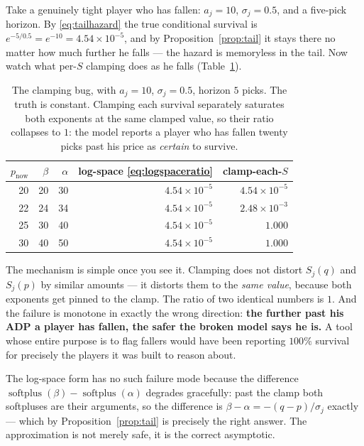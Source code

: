 \documentclass[10pt,a4paper]{article}
\theoremstyle{plain}
\theoremstyle{definition}
\theoremstyle{remark}
\begin{document}
Take a genuinely tight player who has fallen: $a_j = 10$, $\sigma_j = 0.5$, and a
five-pick horizon. By \eqref{eq:tailhazard} the true conditional survival is
$e^{-5/0.5} = e^{-10} = 4.54\times10^{-5}$, and by Proposition~\ref{prop:tail} it stays
there no matter how much further he falls --- the hazard is memoryless in the tail.
Now watch what per-$S$ clamping does as he falls (Table~\ref{tab:clampbug}).

\begin{table}[htbp]
\centering
\small
\begin{tabular}{rrrrr}
\toprule
$p_{\text{now}}$ & $\beta$ & $\alpha$ & log-space \eqref{eq:logspaceratio} & clamp-each-$S$ \\
\midrule
20 & 20 & 30 & $4.54\times10^{-5}$ & $4.54\times10^{-5}$ \\
22 & 24 & 34 & $4.54\times10^{-5}$ & $2.48\times10^{-3}$ \\
25 & 30 & 40 & $4.54\times10^{-5}$ & $\mathbf{1.000}$ \\
30 & 40 & 50 & $4.54\times10^{-5}$ & $\mathbf{1.000}$ \\
\bottomrule
\end{tabular}
\caption{The clamping bug, with $a_j = 10$, $\sigma_j = 0.5$, horizon $5$ picks. The
truth is constant. Clamping each survival separately saturates both exponents at the
same clamped value, so their ratio collapses to $1$: the model reports a player who has
fallen twenty picks past his price as \emph{certain} to survive.}
\label{tab:clampbug}
\end{table}

The mechanism is simple once you see it. Clamping does not distort $S_j(q)$ and
$S_j(p)$ by similar amounts --- it distorts them to the \emph{same value}, because both
exponents get pinned to the clamp. The ratio of two identical numbers is $1$. And the
failure is monotone in exactly the wrong direction: \textbf{the further past his ADP a
player has fallen, the safer the broken model says he is.} A tool whose entire purpose
is to flag fallers would have been reporting $100\%$ survival for precisely the players
it was built to reason about.

The log-space form has no such failure mode because the difference
$\operatorname{softplus}(\beta) - \operatorname{softplus}(\alpha)$ degrades gracefully:
past the clamp both softpluses are their arguments, so the difference is
$\beta - \alpha = -(q-p)/\sigma_j$ exactly --- which by Proposition~\ref{prop:tail} is
precisely the right answer. The approximation is not merely safe, it is the correct
asymptotic.
\end{document}
